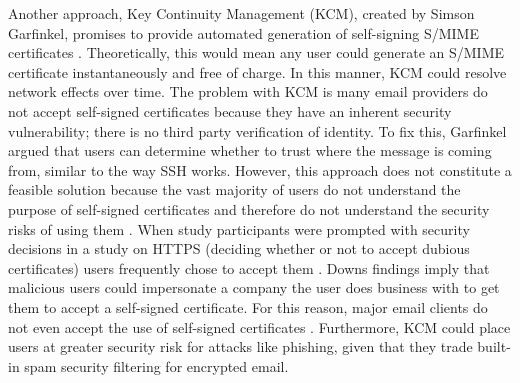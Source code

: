 \documentclass[10pt]{article}
\begin{document}
\begin{multicols}{2}
\par Another approach, Key Continuity Management (KCM), created by Simson Garfinkel, promises to provide automated generation of self-signing S/MIME certificates \cite{garfinkel2005johnny}. Theoretically, this would mean any user could generate an S/MIME certificate instantaneously and free of charge. In this manner, KCM could resolve network effects over time. The problem with KCM is many email providers do not accept self-signed certificates because they have an inherent security vulnerability; there is no third party verification of identity. To fix this, Garfinkel argued that users can determine whether to trust where the message is coming from, similar to the way SSH works\cite{garfinkel2005make}. However, this approach does not constitute a feasible solution because the vast majority of users do not understand the purpose of self-signed certificates and therefore do not understand the security risks of using them \cite{downs2006decision}. When study participants were prompted with security decisions in a study on HTTPS (deciding whether or not to accept dubious certificates) users frequently chose to accept them \cite{callegati2009man}. Downs findings imply that malicious users could impersonate a company the user does business with to get them to accept a self-signed certificate\cite{downs2006decision}. For this reason, major email clients do not even accept the use of self-signed certificates \cite{force-use-of-self}. Furthermore, KCM could place users at greater security risk for attacks like phishing, given that they trade built-in spam security filtering for encrypted email.

\end{multicols}
\end{document}
